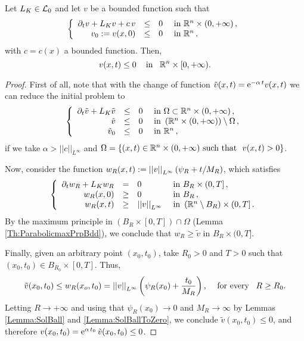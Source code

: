 \begin{theorem}
\label{Th:ParaMaxPrp}
Let $L_K \in \mathcal{L}_0$ and let $v$ be a bounded function such that
\begin{equation*}
\left\{\begin{array}{rcll}
\partial_t v + L_K  v + c\,v &\leq& 0 & \textrm{ in }\mathbb{R}^n\times(0,+\infty)\,,\\
v_0:=v(x,0) &\leq& 0 & \textrm{ in } \mathbb{R}^n\,,
\end{array} \right.
\end{equation*}
with $c=c(x)$ a bounded function. Then,
$$ v(x,t) \leq 0 \,\,\,\,\,\text{ in } \,\,\, \mathbb{R}^n\times[0,+\infty). $$
\end{theorem}

\begin{proof}
First of all, note that with the change of function $\tilde{v}(x,t) = \mathrm{e}^{-\alpha\,t} v(x,t)$ we can reduce the initial problem to
\begin{equation*}
\left\{\begin{array}{rcll}
\partial_t \tilde{v} + L_K  \tilde{v} &\leq& 0 & \textrm{ in } \Omega \subset\mathbb{R}^n\times(0,+\infty)\,,\\
\tilde{v} &\leq& 0 & \textrm{ in }  \left(\mathbb{R}^n\times(0,+\infty)\right) \setminus  \Omega\,,\\
\tilde{v}_0 &\leq& 0 & \textrm{ in } \mathbb{R}^n\,,
\end{array} \right.
\end{equation*}
if we take $\alpha > ||c||_{L^\infty}$ and $\Omega = \{(x,t)\in \mathbb{R}^n\times(0,+\infty) \ \textrm{such that } \ v(x,t) > 0\}$.

Now, consider the function $ w_R(x,t) := \left | \left |{v} \right | \right |_{L^\infty} ( \psi_R + t/M_R )$, which satisfies
\begin{equation*}
\left\{\begin{array}{rcll}
\partial_t w_R + L_K  w_R &=& 0 & \textrm{ in }B_R\times(0,T]\,,\\
w_R(x,0) &\geq& 0 & \textrm{ in } B_R\,,\\
w_R(x,t) &\geq& \left | \left |{v} \right | \right |_{L^\infty}  & \textrm{ in } \left( \mathbb{R}^n\setminus B_R\right) \times (0,T] \,.
\end{array} \right.
\end{equation*}
By the maximum principle in $(B_R\times[0,T])\cap \Omega$ (Lemma \ref{Th:ParabolicmaxPrpBdd}), we conclude that $ w_R\geq \tilde{v} $ in $B_R\times(0,T]$.

Finally, given an arbitrary point $(x_0,t_0)$, take $R_0>0$ and $T>0$ such that $(x_0,t_0)\in B_{R_0}\times [0,T]$. Thus,
$$ \tilde{v}(x_0,t_0) \leq w_R(x_o,t_0) = \left | \left |{v} \right | \right |_{L^\infty} \left(  \psi_R(x_0) + \frac{t_0}{M_R} \right), \,\,\,\,\,\text{ for every }\,\,\, R\geq R_0.
$$
Letting $R \to +\infty$ and using that $\psi_R(x_0) \to 0$ and $M_R \to \infty$ by Lemmas
\ref{Lemma:SolBall} and \ref{Lemma:SolBallToZero}, we conclude $ \tilde{v}(x_0,t_0) \leq  0$, and
therefore $ v(x_0,t_0) = \mathrm{e}^{\alpha\,t_0}\,\tilde{v}(x_0,t_0) \leq 0$.
\end{proof}

